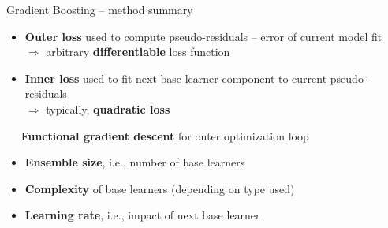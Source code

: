 \begin{frame}{Gradient Boosting -- method summary}

\footnotesize


\begin{itemize}
  \item \textbf{Outer loss} used to compute pseudo-residuals -- error of 
  current model fit \\
  $\Rightarrow$ arbitrary \textbf{differentiable} loss function
  \item \textbf{Inner loss} used to fit next base learner component to 
  current pseudo-residuals \\
  $\Rightarrow$ typically, \textbf{quadratic loss}
\end{itemize}

\medskip

 ~~ \textbf{Functional gradient descent} for outer 
optimization loop

\medskip


\begin{itemize}
  \item \textbf{Ensemble size}, i.e., number of base learners
  \item \textbf{Complexity} of base learners (depending on type used)
  \item \textbf{Learning rate}, i.e., impact of next base learner
\end{itemize}

\medskip


\end{frame}


